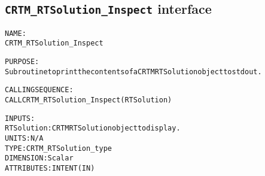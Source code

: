 \subsection{\texttt{CRTM\_RTSolution\_Inspect} interface}
  \label{sec:CRTM_RTSolution_Inspect_interface}
  \begin{alltt}
 
  NAME:
        CRTM_RTSolution_Inspect
 
  PURPOSE:
        Subroutine to print the contents of a CRTM RTSolution object to stdout.
 
  CALLING SEQUENCE:
        CALL CRTM_RTSolution_Inspect( RTSolution )
 
  INPUTS:
        RTSolution:    CRTM RTSolution object to display.
                       UNITS:      N/A
                       TYPE:       CRTM_RTSolution_type
                       DIMENSION:  Scalar
                       ATTRIBUTES: INTENT(IN)
 
  \end{alltt}

